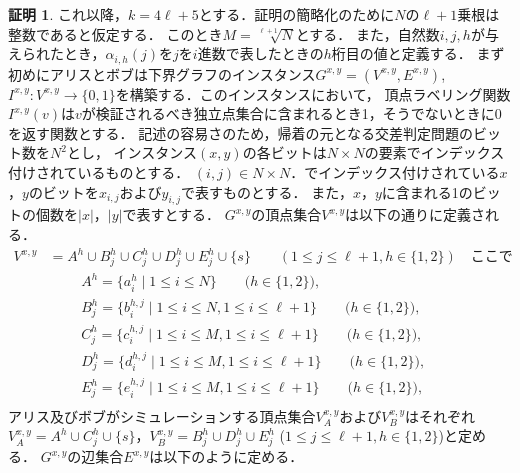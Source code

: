 \documentclass[12pt]{thesis}
\theoremstyle{definition}
\newtheorem*{prf*}{証明}
\begin{document}
\begin{prf*}
これ以降，$k = 4\ell +5$とする．証明の簡略化のために$N$の$\ell + 1$乗根は整数であると仮定する．
このとき$M = \sqrt[\ell + 1]{N}$とする．
また，自然数$i, j, h$が与えられたとき，$\alpha_{i, h}(j)$を$j$を$i$進数で表したときの$h$桁目の値と定義する．
まず初めにアリスとボブは下界グラフのインスタンス$G^{x,y} = (V^{x,y}, E^{x,y})$, 
$I^{x,y} : V^{x,y} \to \{0, 1\}$を構築する．このインスタンスにおいて，
頂点ラベリング関数$I^{x,y}(v)$は$v$が検証されるべき独立点集合に含まれるとき1，そうでないときに0を返す関数とする．
記述の容易さのため，帰着の元となる交差判定問題のビット数を$N^2$とし，
インスタンス$(x, y)$の各ビットは$N\times N$の要素でインデックス付けされているものとする．
$(i, j) \in N \times N$．でインデックス付けされている$x$，$y$のビットを$x_{i,j}$および$y_{i,j}$で表すものとする．
また，$x$，$y$に含まれる1のビットの個数を$|x|$，$|y|$で表すとする．
$G^{x,y}$の頂点集合$V^{x,y}$は以下の通りに定義される．
\begin{align*}
V^{x,y} &= A^{h} \cup B^{h}_{j} \cup C^{h}_{j} \cup D^{h}_{j} \cup E^{h}_{j} \cup \{s\} \quad \quad (1\leq j \leq \ell+1, h \in \{1, 2\}) \quad \text{ここで}\\
&\phantom{=} \quad A^{h} = \{a^{h}_{i} \mid 1\leq i \leq N\} \quad \quad \text{($h \in \{1, 2\}$)}, \\
&\phantom{=} \quad B^{h}_{j} = \{b^{h,j}_{i} \mid 1\leq i \leq N,1\leq i \leq \ell+1\} \quad \quad \text{($h \in \{1, 2\}$)}, \\
&\phantom{=} \quad C^{h}_{j} = \{c^{h,j}_{i} \mid 1\leq i \leq M,1\leq i \leq \ell+1\} \quad \quad \text{($h \in \{1, 2\}$)}, \\
&\phantom{=} \quad D^{h}_{j} = \{d^{h,j}_{i} \mid 1\leq i \leq M,1\leq i \leq \ell+1\} \quad \quad \text{($h \in \{1, 2\}$)}, \\
&\phantom{=} \quad E^{h}_{j} = \{e^{h,j}_{i} \mid 1\leq i \leq M,1\leq i \leq \ell+1\} \quad \quad \text{($h \in \{1, 2\}$)}, \\
\end{align*}
アリス及びボブがシミュレーションする頂点集合$V^{x,y}_{A}$および$V^{x,y}_{B}$はそれぞれ
$V^{x,y}_{A} = A^{h} \cup C^{h}_{j} \cup \{s\}$，$V^{x,y}_{B} = B^{h}_{j} \cup D^{h}_{j} \cup E^{h}_{j}$
($1\leq j \leq \ell+1, h \in \{1, 2\}$)と定める．
$G^{x,y}$の辺集合$E^{x,y}$は以下のように定める．


\end{prf*}
\end{document}
